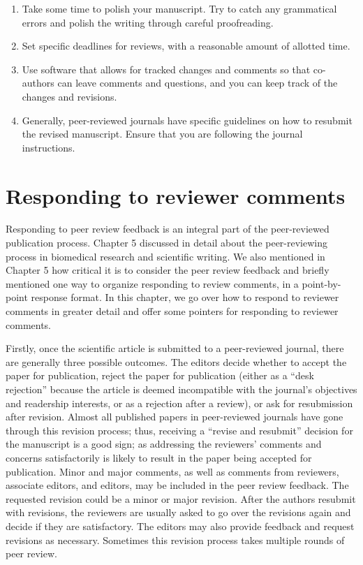 \documentclass[
]{book}
\providecommand{\tightlist}{%
  \setlength{\itemsep}{0pt}\setlength{\parskip}{0pt}}
\begin{document}
\begin{enumerate}
\def\labelenumi{\arabic{enumi}.}
\tightlist
\item
  Take some time to polish your manuscript. Try to catch any grammatical errors and polish the writing through careful proofreading.
\item
  Set specific deadlines for reviews, with a reasonable amount of allotted time.
\item
  Use software that allows for tracked changes and comments so that co-authors can leave comments and questions, and you can keep track of the changes and revisions.
\item
  Generally, peer-reviewed journals have specific guidelines on how to resubmit the revised manuscript. Ensure that you are following the journal instructions.
\end{enumerate}

\hypertarget{responding-to-reviewer-comments}{%
\chapter{Responding to reviewer comments}\label{responding-to-reviewer-comments}}

Responding to peer review feedback is an integral part of the peer-reviewed publication process. Chapter 5 discussed in detail about the peer-reviewing process in biomedical research and scientific writing. We also mentioned in Chapter 5 how critical it is to consider the peer review feedback and briefly mentioned one way to organize responding to review comments, in a point-by-point response format. In this chapter, we go over how to respond to reviewer comments in greater detail and offer some pointers for responding to reviewer comments.

Firstly, once the scientific article is submitted to a peer-reviewed journal, there are generally three possible outcomes. The editors decide whether to accept the paper for publication, reject the paper for publication (either as a ``desk rejection'' because the article is deemed incompatible with the journal's objectives and readership interests, or as a rejection after a review), or ask for resubmission after revision. Almost all published papers in peer-reviewed journals have gone through this revision process; thus, receiving a ``revise and resubmit'' decision for the manuscript is a good sign; as addressing the reviewers' comments and concerns satisfactorily is likely to result in the paper being accepted for publication. Minor and major comments, as well as comments from reviewers, associate editors, and editors, may be included in the peer review feedback. The requested revision could be a minor or major revision. After the authors resubmit with revisions, the reviewers are usually asked to go over the revisions again and decide if they are satisfactory. The editors may also provide feedback and request revisions as necessary. Sometimes this revision process takes multiple rounds of peer review.
\end{document}
